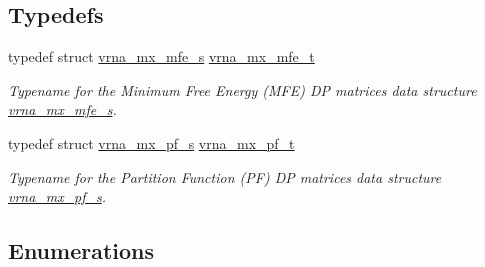 \subsection*{Typedefs}
\begin{DoxyCompactItemize}
\item 
typedef struct \hyperlink{group__dp__matrices_structvrna__mx__mfe__s}{vrna\+\_\+mx\+\_\+mfe\+\_\+s} \hyperlink{group__dp__matrices_gae5aef35d016475e758f619b7bcb534f9}{vrna\+\_\+mx\+\_\+mfe\+\_\+t}\hypertarget{group__dp__matrices_gae5aef35d016475e758f619b7bcb534f9}{}\label{group__dp__matrices_gae5aef35d016475e758f619b7bcb534f9}

\begin{DoxyCompactList}\small\item\em Typename for the Minimum Free Energy (M\+FE) DP matrices data structure \hyperlink{group__dp__matrices_structvrna__mx__mfe__s}{vrna\+\_\+mx\+\_\+mfe\+\_\+s}. \end{DoxyCompactList}\item 
typedef struct \hyperlink{group__dp__matrices_structvrna__mx__pf__s}{vrna\+\_\+mx\+\_\+pf\+\_\+s} \hyperlink{group__dp__matrices_ga68729ab3fed26bdd1806fa814f172fc1}{vrna\+\_\+mx\+\_\+pf\+\_\+t}\hypertarget{group__dp__matrices_ga68729ab3fed26bdd1806fa814f172fc1}{}\label{group__dp__matrices_ga68729ab3fed26bdd1806fa814f172fc1}

\begin{DoxyCompactList}\small\item\em Typename for the Partition Function (PF) DP matrices data structure \hyperlink{group__dp__matrices_structvrna__mx__pf__s}{vrna\+\_\+mx\+\_\+pf\+\_\+s}. \end{DoxyCompactList}\end{DoxyCompactItemize}
\subsection*{Enumerations}
